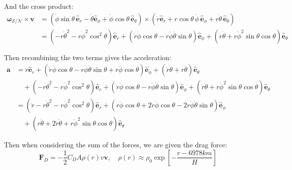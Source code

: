 \documentclass[titlepage]{article}
\begin{document}
And the cross product:
\begin{equation}
	\begin{split}
		\boldsymbol{\omega}_{\mathcal{S}/\mathcal{N}}\times\boldsymbol{v}&=\left(\dot{\phi}\sin\theta\,\hat{\boldsymbol{e}}_r-\dot{\theta}\hat{\boldsymbol{e}}_\phi+\dot{\phi}\cos\theta\,\hat{\boldsymbol{e}}_\theta\right)\times\left(\dot{r}\hat{\boldsymbol{e}}_r+r\cos\theta\,\dot{\phi}\,\hat{\boldsymbol{e}}_\phi+r\dot{\theta}\,\hat{\boldsymbol{e}}_\theta\right) \\
		&=\left(-r\dot{\theta}^2-r\dot{\phi}^2\cos^2\theta\right)\hat{\boldsymbol{e}}_r+\left(\dot{r}\dot{\phi}\cos\theta-r\dot{\phi}\dot{\theta}\sin\theta\right)\hat{\boldsymbol{e}}_\phi+\left(\dot{r}\dot{\theta}+r\dot{\phi}^2\sin\theta\cos\theta\right)\hat{\boldsymbol{e}}_\theta
	\end{split}
\end{equation}

Then recombining the two terms gives the acceleration:
\begin{equation}
	\begin{split}
		\boldsymbol{a}&=\ddot{r}\hat{\boldsymbol{e}}_r+\left(\dot{r}\dot{\phi}\cos\theta-r\dot{\phi}\dot{\theta}\sin\theta+r\ddot{\phi}\cos\theta\right)\hat{\boldsymbol{e}}_\phi+\left(\dot{r}\dot{\theta}+r\ddot{\theta}\right)\hat{\boldsymbol{e}}_\theta \\
		&\quad+\left(-r\dot{\theta}^2-r\dot{\phi}^2\cos^2\theta\right)\hat{\boldsymbol{e}}_r+\left(\dot{r}\dot{\phi}\cos\theta-r\dot{\phi}\dot{\theta}\sin\theta\right)\hat{\boldsymbol{e}}_\phi+\left(\dot{r}\dot{\theta}+r\dot{\phi}^2\sin\theta\cos\theta\right)\hat{\boldsymbol{e}}_\theta \\
		&=\left(\ddot{r}-r\dot{\theta}^2-r\dot{\phi}^2\cos^2\theta\right)\hat{\boldsymbol{e}}_r+\left(r\ddot{\phi}\cos\theta+2\dot{r}\dot{\phi}\cos\theta-2r\dot{\phi}\dot{\theta}\sin\theta\right)\hat{\boldsymbol{e}}_\phi \\
		&\quad+\left(r\ddot{\theta}+2\dot{r}\dot{\theta}+r\dot{\phi}^2\sin\theta\cos\theta\right)\hat{\boldsymbol{e}}_\theta
	\end{split}
\end{equation}

Then when considering the sum of the forces, we are given the drag force:
\begin{equation}
	\boldsymbol{F}_D=-\frac{1}{2}C_DA\rho(r)v\boldsymbol{v},\quad\rho(r)\approx\rho_0\exp\left[-\frac{r-6978km}{H}\right]
\end{equation}
\end{document}
